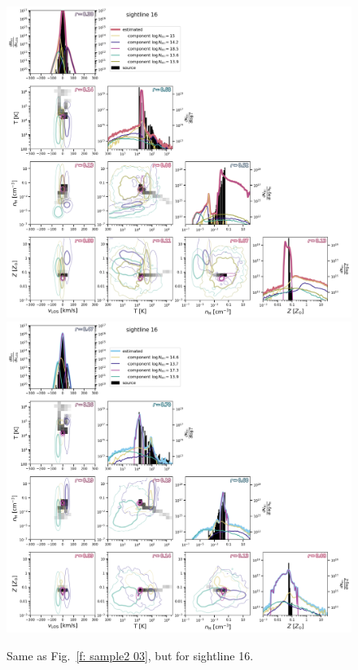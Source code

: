 \documentclass[fleqn,usenatbib]{mnras}
\begin{document}
\begin{figure}
    \centering
    \includegraphics[height=0.45\textheight]{figures/sample2/original/sightline_0016.png}
    \includegraphics[height=0.45\textheight]{figures/sample2/high-z/sightline_0016.png}
    \label{f: sample2 16 corner}
    \caption{Same as Fig.~\ref{f: sample2 03}, but for sightline 16.}
\end{figure}
\end{document}
